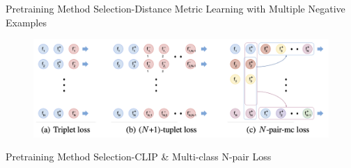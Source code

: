 \documentclass[aspectratio=169,xcolor=dvipsnames]{beamer}
\begin{document}

\begin{frame}{Pretraining Method Selection-Distance Metric Learning with Multiple Negative Examples}
    \begin{figure}
        \centering
        \includegraphics[width=0.9\linewidth]{figures/pushing_N_examples_simultaneously.png}
        \label{n_examples}
    \end{figure}
\end{frame}


\begin{frame}{Pretraining Method Selection-CLIP \& Multi-class N-pair Loss}    
    \begin{figure}
        \centering
        \qquad
    \end{figure}
\end{frame}
\end{document}
